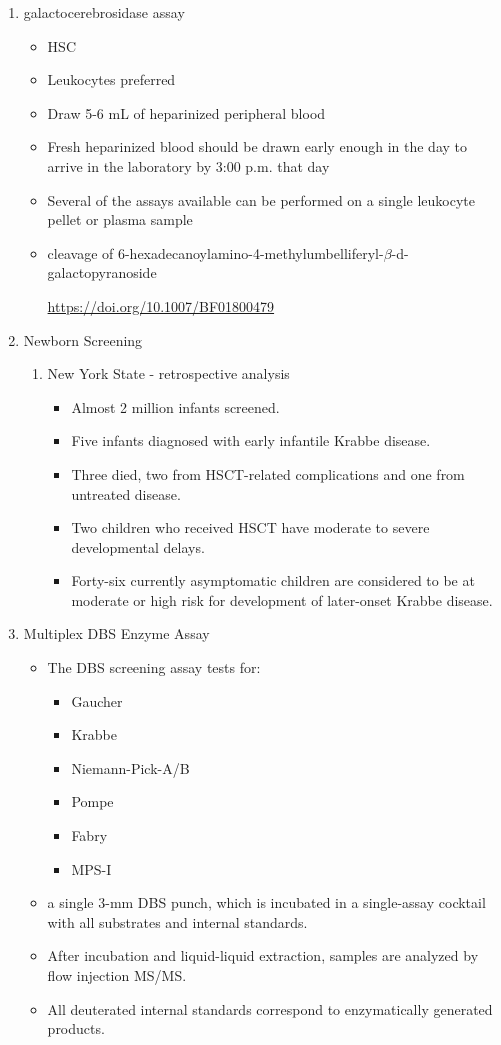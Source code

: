 \documentclass{scrartcl}
\begin{document}
\begin{enumerate}
\begin{enumerate}
\item galactocerebrosidase assay
\label{sec:orge254711}

\begin{itemize}
\item HSC
\item Leukocytes preferred
\item Draw 5-6 mL of heparinized peripheral blood
\item Fresh heparinized blood should be drawn early enough in the day to arrive in the laboratory by 3:00 p.m. that day
\item Several of the assays available can be performed on a single leukocyte pellet or plasma sample

\item cleavage of 6-hexadecanoylamino-4-methylumbelliferyl-\(\beta\)-d-galactopyranoside

\url{https://doi.org/10.1007/BF01800479}
\end{itemize}


\item Newborn Screening
\label{sec:orgbeb0f06}
\begin{enumerate}
\item New York State - retrospective analysis
\label{sec:orgf271fbb}
\begin{itemize}
\item Almost 2 million infants screened.
\item Five infants diagnosed with early infantile Krabbe disease.
\item Three died, two from HSCT-related complications and one from untreated disease.
\item Two children who received HSCT have moderate to severe developmental delays.
\item Forty-six currently asymptomatic children are considered to be at
moderate or high risk for development of later-onset Krabbe disease.
\end{itemize}
\end{enumerate}


\item Multiplex DBS  Enzyme Assay
\label{sec:org4ac72b2}
\begin{itemize}
\item The DBS screening assay tests for:
\begin{itemize}
\item Gaucher
\item Krabbe
\item Niemann-Pick-A/B
\item Pompe
\item Fabry
\item MPS-I
\end{itemize}
\item a single 3-mm DBS punch, which is incubated in a single-assay
cocktail with all substrates and internal standards.
\item After incubation and liquid-liquid extraction, samples are analyzed by flow injection MS/MS.
\item All deuterated internal standards correspond to enzymatically generated products.
\end{itemize}



\end{enumerate}
\end{enumerate}
\end{document}
